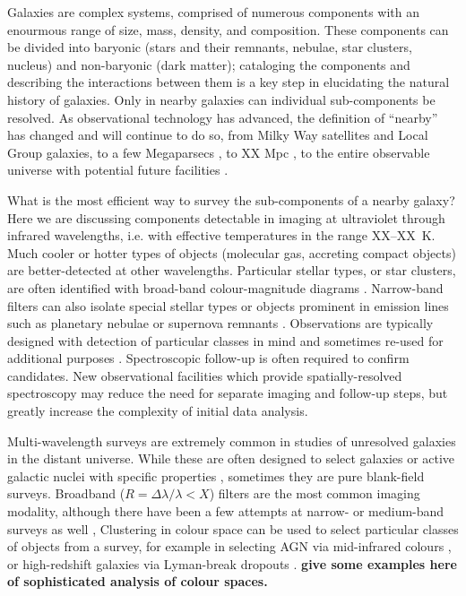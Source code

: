 

Galaxies are complex systems, comprised of numerous components with an enourmous range of size,
mass, density, and composition.
These components can be divided into baryonic (stars and their remnants,
nebulae, star clusters, nucleus) and non-baryonic (dark matter);
cataloging the components and describing
the interactions between them is a key step in elucidating the natural history of galaxies.
Only in nearby galaxies can individual sub-components be resolved.
As observational technology has advanced,
the definition of ``nearby'' has changed and will continue to do so, from Milky Way satellites and Local Group galaxies, to a few
Megaparsecs \citep[distance at which stars can be resolved with HST][]{},
to XX Mpc \citep[distance at which stars can be resolved with JWST][]{},
to the entire observable universe with potential future facilities \citep{}.

What is the most efficient way to survey the sub-components of a nearby galaxy?
Here we are discussing components detectable in imaging at ultraviolet through infrared wavelengths,
i.e. with effective temperatures in the range XX--XX~K.
Much cooler or hotter types of objects (molecular gas, accreting compact objects) are better-detected at other wavelengths.
Particular stellar types, or star clusters, are often identified with broad-band colour-magnitude diagrams \citep[e.g.][]{}.
Narrow-band filters can also isolate special stellar types \citep[e.g.][]{} or objects prominent in emission
lines such as planetary nebulae or supernova remnants \citep[e.g.][]{}.
Observations are typically designed with detection of particular classes in mind and sometimes re-used for additional purposes \citep[e.g.][]{}.
Spectroscopic follow-up is often required to confirm candidates.
New observational facilities which provide spatially-resolved spectroscopy  \citep[e.g.]{}{} may reduce the need for separate imaging and follow-up steps,
but greatly increase the complexity of initial data analysis.


Multi-wavelength surveys are extremely common in studies of unresolved galaxies in the distant universe.
While these are often designed to select galaxies or active galactic nuclei with specific properties \citep[e.g.][]{},
sometimes they are pure blank-field surveys.
Broadband ($R=\Delta \lambda/\lambda < X$) filters are the most common imaging modality,
although there have been a few attempts at narrow- or medium-band surveys as well \citep[e.g.][]{combo-17},
Clustering in colour space can be used to select particular classes of objects from a survey,
for example in selecting AGN via mid-infrared colours \citep[e.g.][]{},
or high-redshift galaxies via Lyman-break dropouts \citep[e.g.][]{}. 
{\bf give some examples here of sophisticated analysis of colour spaces.}

